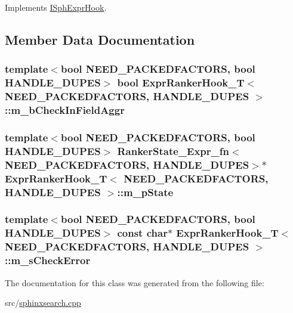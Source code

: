 Implements \hyperlink{structISphExprHook_aef2dae7cfa01dcae36195b6327bb37d9}{I\-Sph\-Expr\-Hook}.



\subsection{Member Data Documentation}
\hypertarget{classExprRankerHook__T_a827bfc58e9a915309e59c62eacaf55b4}{
\subsubsection[{m\-\_\-b\-Check\-In\-Field\-Aggr}]{\setlength{\rightskip}{0pt plus 5cm}template$<$bool N\-E\-E\-D\-\_\-\-P\-A\-C\-K\-E\-D\-F\-A\-C\-T\-O\-R\-S, bool H\-A\-N\-D\-L\-E\-\_\-\-D\-U\-P\-E\-S$>$ bool {\bf Expr\-Ranker\-Hook\-\_\-\-T}$<$ N\-E\-E\-D\-\_\-\-P\-A\-C\-K\-E\-D\-F\-A\-C\-T\-O\-R\-S, H\-A\-N\-D\-L\-E\-\_\-\-D\-U\-P\-E\-S $>$\-::m\-\_\-b\-Check\-In\-Field\-Aggr}}\label{classExprRankerHook__T_a827bfc58e9a915309e59c62eacaf55b4}
\hypertarget{classExprRankerHook__T_a12de2c7f7c3091e0f0bc89dd29a7a7ec}{
\subsubsection[{m\-\_\-p\-State}]{\setlength{\rightskip}{0pt plus 5cm}template$<$bool N\-E\-E\-D\-\_\-\-P\-A\-C\-K\-E\-D\-F\-A\-C\-T\-O\-R\-S, bool H\-A\-N\-D\-L\-E\-\_\-\-D\-U\-P\-E\-S$>$ {\bf Ranker\-State\-\_\-\-Expr\-\_\-fn}$<$N\-E\-E\-D\-\_\-\-P\-A\-C\-K\-E\-D\-F\-A\-C\-T\-O\-R\-S, H\-A\-N\-D\-L\-E\-\_\-\-D\-U\-P\-E\-S$>$$\ast$ {\bf Expr\-Ranker\-Hook\-\_\-\-T}$<$ N\-E\-E\-D\-\_\-\-P\-A\-C\-K\-E\-D\-F\-A\-C\-T\-O\-R\-S, H\-A\-N\-D\-L\-E\-\_\-\-D\-U\-P\-E\-S $>$\-::m\-\_\-p\-State}}\label{classExprRankerHook__T_a12de2c7f7c3091e0f0bc89dd29a7a7ec}
\hypertarget{classExprRankerHook__T_ab7b5eaeeb5502970c487b0b83d5f2647}{
\subsubsection[{m\-\_\-s\-Check\-Error}]{\setlength{\rightskip}{0pt plus 5cm}template$<$bool N\-E\-E\-D\-\_\-\-P\-A\-C\-K\-E\-D\-F\-A\-C\-T\-O\-R\-S, bool H\-A\-N\-D\-L\-E\-\_\-\-D\-U\-P\-E\-S$>$ const char$\ast$ {\bf Expr\-Ranker\-Hook\-\_\-\-T}$<$ N\-E\-E\-D\-\_\-\-P\-A\-C\-K\-E\-D\-F\-A\-C\-T\-O\-R\-S, H\-A\-N\-D\-L\-E\-\_\-\-D\-U\-P\-E\-S $>$\-::m\-\_\-s\-Check\-Error}}\label{classExprRankerHook__T_ab7b5eaeeb5502970c487b0b83d5f2647}


The documentation for this class was generated from the following file\-:\begin{DoxyCompactItemize}
\item 
src/\hyperlink{sphinxsearch_8cpp}{sphinxsearch.\-cpp}\end{DoxyCompactItemize}

